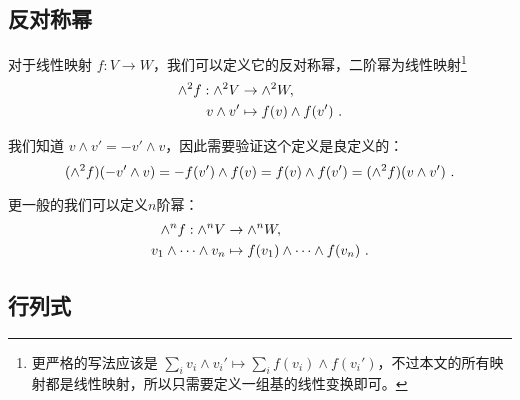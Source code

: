 
\begin{issues}
\issueOther{}
\end{issues}



\subsection{反对称幂}

对于线性映射 $f: V \to W$，我们可以定义它的反对称幂，二阶幂为线性映射\footnote{更严格的写法应该是 $\sum_i v_i \wedge v_i' \mapsto \sum_i f(v_i) \wedge f(v_i')$，不过本文的所有映射都是线性映射，所以只需要定义一组基的线性变换即可。}
\begin{equation}
\begin{aligned}
{\large \wedge}^2 f: {\large \wedge}^2 V &\to {\large \wedge}^2 W, \\
v \wedge v' &\mapsto f(v) \wedge f(v')~.
\end{aligned}
\end{equation}

我们知道 $v \wedge v' = - v' \wedge v$，因此需要验证这个定义是良定义的：
\begin{equation}
({\large \wedge}^2 f)(- v' \wedge v) = - f(v') \wedge f(v) = f(v) \wedge f(v') = ({\large \wedge}^2 f)(v \wedge v')~.
\end{equation}

更一般的我们可以定义$n$阶幂：
\begin{equation}
\begin{aligned}
{\large \wedge}^n f: {\large \wedge}^n V &\to {\large \wedge}^n W, \\
v_1 \wedge \cdots \wedge v_n &\mapsto f(v_1) \wedge \cdots \wedge f(v_n)~.
\end{aligned}
\end{equation}

\subsection{行列式}

